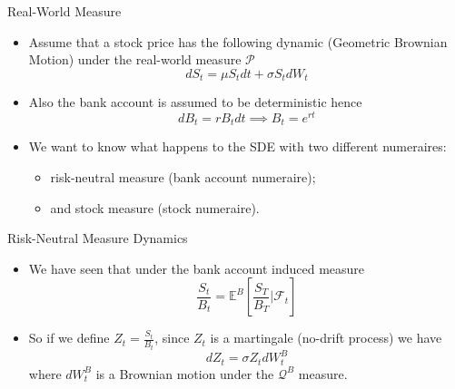 \documentclass{beamer}
\begin{document}










\begin{frame}{Real-World Measure}
\begin{itemize}
	\item Assume that a stock price has the following dynamic (Geometric Brownian Motion) under the real-world measure $\mathcal{P}$
	\begin{equation*}
	dS_t = \mu S_t dt + \sigma S_t dW_t
	\end{equation*}
	\item Also the bank account is assumed to be deterministic hence
	\begin{equation*}
	dB_t = rB_tdt\implies B_t = e^{rt}
	\end{equation*}
	\item We want to know what happens to the SDE with two different numeraires:
	\begin{itemize}
		\item risk-neutral measure (bank account numeraire);
		\item and stock measure (stock numeraire).
	\end{itemize}
\end{itemize}
\end{frame}

\begin{frame}{Risk-Neutral Measure Dynamics}
	\begin{itemize}
	\item We have seen that under the bank account induced measure
	\begin{equation*}
	\frac{S_t}{B_t} = \mathbb{E}^B\left[\frac{S_T}{B_T}\bigg|\mathcal{F}_t\right]
	\end{equation*}
	\item So if we define $Z_t=\frac{S_t}{B_t}$, since $Z_t$ is a martingale (no-drift process) we have 
	\begin{equation}
	dZ_t = \sigma Z_t dW_t^B
	\label{eq:z_martingale1}
	\end{equation}
	where $dW_t^B$ is a Brownian motion under the $\mathcal{Q}^B$ measure.
\end{itemize}
\end{frame}
\end{document}
